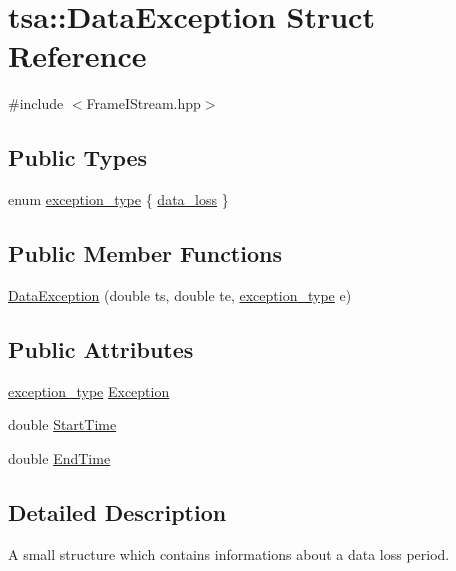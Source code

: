 \hypertarget{structtsa_1_1_data_exception}{}\section{tsa\+:\+:Data\+Exception Struct Reference}
\label{structtsa_1_1_data_exception}


{\ttfamily \#include $<$Frame\+I\+Stream.\+hpp$>$}

\subsection*{Public Types}
\begin{DoxyCompactItemize}
\item 
enum \hyperlink{structtsa_1_1_data_exception_a712f1aa505cbed35af618dd632181d18}{exception\+\_\+type} \{ \hyperlink{structtsa_1_1_data_exception_a712f1aa505cbed35af618dd632181d18a290a1df6b3d5c0756ca3bb8c12a4e25e}{data\+\_\+loss}
 \}
\end{DoxyCompactItemize}
\subsection*{Public Member Functions}
\begin{DoxyCompactItemize}
\item 
\hyperlink{structtsa_1_1_data_exception_a9f85452c8350284658dc9c8389871c19}{Data\+Exception} (double ts, double te, \hyperlink{structtsa_1_1_data_exception_a712f1aa505cbed35af618dd632181d18}{exception\+\_\+type} e)
\end{DoxyCompactItemize}
\subsection*{Public Attributes}
\begin{DoxyCompactItemize}
\item 
\hyperlink{structtsa_1_1_data_exception_a712f1aa505cbed35af618dd632181d18}{exception\+\_\+type} \hyperlink{structtsa_1_1_data_exception_aaae025849a7bf6de877817af91482a55}{Exception}
\item 
double \hyperlink{structtsa_1_1_data_exception_a421e0d69c69536dea4e49a26eb644385}{Start\+Time}
\item 
double \hyperlink{structtsa_1_1_data_exception_a38964a3999b72d3a8860f6b870eadef6}{End\+Time}
\end{DoxyCompactItemize}


\subsection{Detailed Description}
A small structure which contains informations about a data loss period. 

